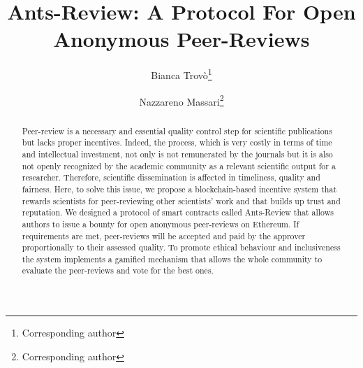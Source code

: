 \documentclass[runningheads]{llncs}
\begin{document}
%
\title{Ants-Review: A Protocol For Open Anonymous Peer-Reviews}
%
%
\author{Bianca Trovò\thanks{Corresponding author}\and
Nazzareno Massari\thanks{Corresponding author}}
%
%
%
\maketitle              %
%
\begin{abstract}
Peer-review is a necessary and essential quality control step for scientific publications but lacks proper  incentives. Indeed, the process, which is very costly in terms of time and intellectual investment, not only is not remunerated by the journals but it is also not openly recognized by the academic community as a relevant scientific output for a researcher. Therefore, scientific dissemination is affected in timeliness, quality and fairness. Here, to solve this issue, we propose a blockchain-based incentive system that rewards scientists for peer-reviewing other scientists’ work and that builds up trust and reputation. We designed a protocol of smart contracts called Ants-Review that allows authors to issue a bounty for open anonymous peer-reviews on Ethereum. If requirements are met, peer-reviews will be accepted and paid by the approver proportionally to their assessed quality. To promote ethical behaviour and inclusiveness the system implements a gamified mechanism that allows the whole community to evaluate the peer-reviews and vote for the best ones.
\end{abstract}
%
%
\end{document}
